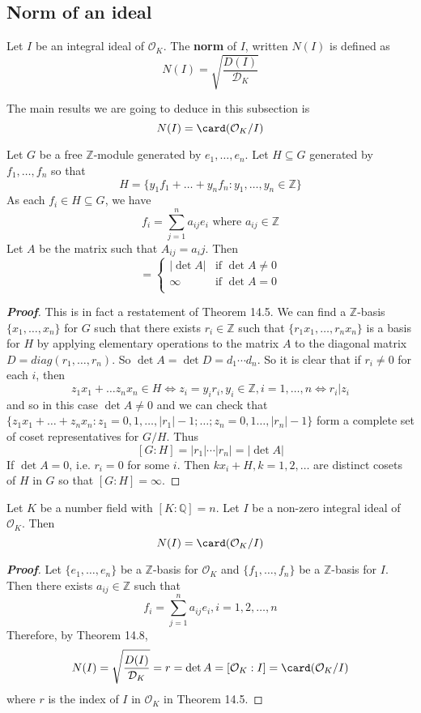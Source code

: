 \subsection{Norm of an ideal}
\begin{definition} Let $I$ be an integral ideal of $\mathcal{O}_K$. The {\bf norm} of $I$, written $N(I)$ is defined as
$$N(I)=\sqrt{\frac{D(I)}{\mathcal{D}_K}}$$
\end{definition}
The main results we are going to deduce in this subsection is
$$N(I)=\card(\mathcal{O}_K/I)$$
\begin{theorem} Let $G$ be a free $\mathbb{Z}$-module generated by $e_1,\ldots,e_n$. Let $H \subseteq G$ generated by
$f_1,\ldots,f_n$ so that
$$H=\{y_1f_1+\ldots+y_nf_n: y_1,\ldots,y_n \in \mathbb{Z}\}$$
As each $f_i \in H \subseteq G$, we have
$$f_i =\sum_{j=1}^n a_{ij}e_i \text{ where } a_{ij} \in \mathbb{Z}$$
Let $A$ be the matrix such that $A_{ij}=a_ij$. Then
\begin{equation*}
[G:H]= \left\{
\begin{array}{ll}
|\det{A}| & \text{if } \det{A} \neq 0\\
\infty & \text{if } \det{A}=0\\
\end{array} \right.
\end{equation*}
\end{theorem}
\begin{proof}[\bf Proof] This is in fact a restatement of Theorem 14.5. We can find a $\mathbb{Z}$-basis $\{x_1,\ldots,x_n\}$ for $G$ such that there exists $r_i \in \mathbb{Z}$ such that $\{r_1x_1,\ldots,r_nx_n\}$ is a basis for $H$ by applying elementary operations to the matrix $A$ to the diagonal matrix $D=diag(r_1,\ldots,r_n)$. So
$\det{A}=\det{D}=d_1\cdots d_n$. So it is clear that if $r_i \neq 0$ for each $i$, then
$$z_1x_1+\ldots z_nx_n \in H \iff z_i=y_ir_i, y_i \in \mathbb{Z}, i=1,\ldots,n \iff r_i |z_i$$
and so in this case $\det{A} \neq 0$ and we can check that
$\{z_1x_1+\ldots+z_nx_n: z_1=0,1,\ldots,|r_1|-1; \ldots; z_n=0,1\ldots,|r_n|-1\}$ form a complete set of coset representatives for $G/H$. Thus
$$[G:H]=|r_1| \cdots |r_n|=|\det{A}|$$
If $\det{A}=0$, i.e. $r_i=0$ for some $i$. Then $kx_i+H, k=1,2,\ldots$ are distinct cosets of $H$ in $G$ so that
$[G:H]=\infty$.
\end{proof}
\begin{theorem} Let $K$ be a number field with $[K:\mathbb{Q}]=n$. Let $I$ be a non-zero integral ideal of $\mathcal{O}_K$. Then
$$N(I)=\card(\mathcal{O}_K/I)$$
\end{theorem}
\begin{proof}[\bf Proof] Let $\{e_1,\ldots,e_n\}$ be a $\mathbb{Z}$-basis for $\mathcal{O}_K$ and $\{f_1,\ldots,f_n\}$ be a
$\mathbb{Z}$-basis for $I$. Then there exists $a_{ij} \in \mathbb{Z}$ such that
$$f_i=\sum_{j=1}^n a_{ij}e_i, i=1,2,\ldots,n$$
Therefore, by Theorem 14.8,
$$N(I)=\sqrt{\frac{D(I)}{\mathcal{D}_K}}=r=\det{A}=[\mathcal{O}_K:I]=\card(\mathcal{O}_K/I)$$
where $r$ is the index of $I$ in $\mathcal{O}_K$ in Theorem 14.5.
\end{proof}
